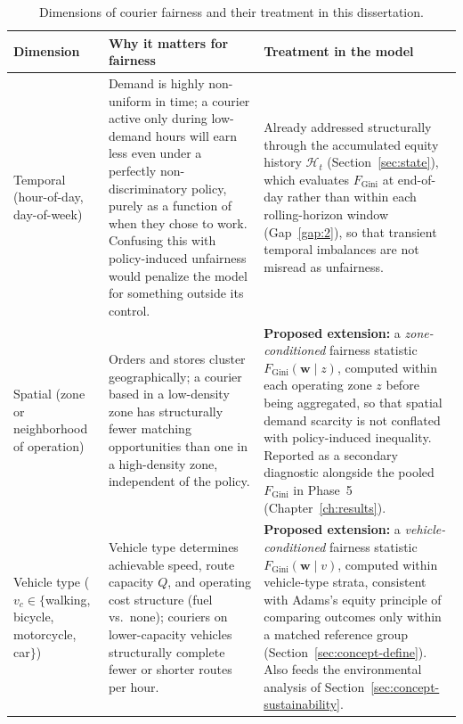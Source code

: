 \documentclass[12pt,a4paper]{report}
\begin{document}
\begin{table}[ht]
\centering
\caption{Dimensions of courier fairness and their treatment in this dissertation.}
\label{tab:fairness-dimensions}
\small
\begin{tabularx}{\textwidth}{p{2.1cm}p{5.3cm}p{6.4cm}}
\toprule
\textbf{Dimension} & \textbf{Why it matters for fairness} & \textbf{Treatment in the model} \\
\midrule
Temporal (hour-of-day, day-of-week) & Demand is highly non-uniform in time; a courier active only during low-demand hours will earn less even under a perfectly non-discriminatory policy, purely as a function of when they chose to work. Confusing this with policy-induced unfairness would penalize the model for something outside its control. &
Already addressed structurally through the accumulated equity history $\mathcal{H}_t$ (Section~\ref{sec:state}), which evaluates $F_{\text{Gini}}$ at end-of-day rather than within each rolling-horizon window (Gap~\ref{gap:2}), so that transient temporal imbalances are not misread as unfairness. \\
\midrule
Spatial (zone or neighborhood of operation) & Orders and stores cluster geographically; a courier based in a low-density zone has structurally fewer matching opportunities than one in a high-density zone, independent of the policy. &
\textbf{Proposed extension:} a \emph{zone-conditioned} fairness statistic $F_{\text{Gini}}(\mathbf{w} \mid z)$, computed within each operating zone $z$ before being aggregated, so that spatial demand scarcity is not conflated with policy-induced inequality. Reported as a secondary diagnostic alongside the pooled $F_{\text{Gini}}$ in Phase~5 (Chapter~\ref{ch:results}). \\
\midrule
Vehicle type ($v_c \in \{$walking, bicycle, motorcycle, car$\}$) & Vehicle type determines achievable speed, route capacity $Q$, and operating cost structure (fuel vs.\ none); couriers on lower-capacity vehicles structurally complete fewer or shorter routes per hour. &
\textbf{Proposed extension:} a \emph{vehicle-conditioned} fairness statistic $F_{\text{Gini}}(\mathbf{w} \mid v)$, computed within vehicle-type strata, consistent with Adams's equity principle of comparing outcomes only within a matched reference group (Section~\ref{sec:concept-define}). Also feeds the environmental analysis of Section~\ref{sec:concept-sustainability}. \\
\bottomrule
\end{tabularx}
\end{table}
\end{document}
